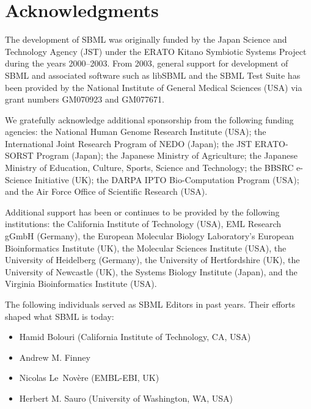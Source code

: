 
\section{Acknowledgments}
\label{sec:acknowledgements}
\label{sec:acknowledgments}

The development of SBML was originally funded by the Japan Science
and Technology Agency (JST) under the ERATO Kitano Symbiotic
Systems Project during the years 2000--2003.  From 2003, general
support for development of SBML and associated software such as
libSBML and the SBML Test Suite has been provided by the National
Institute of General Medical Sciences (USA) via grant numbers
GM070923 and GM077671.

We gratefully acknowledge additional sponsorship from the
following funding agencies: the National Human Genome Research
Institute (USA); the International Joint Research Program of NEDO
(Japan); the JST ERATO-SORST Program (Japan); the Japanese
Ministry of Agriculture; the Japanese Ministry of Education,
Culture, Sports, Science and Technology; the BBSRC e-Science
Initiative (UK); the DARPA IPTO Bio-Computation Program (USA); and
the Air Force Office of Scientific Research (USA).

Additional support has been or continues to be provided by the
following institutions: the California Institute of Technology
(USA), EML Research gGmbH (Germany), the European Molecular
Biology Laboratory's European Bioinformatics Institute (UK), the
Molecular Sciences Institute (USA), the University of Heidelberg
(Germany), the University of Hertfordshire (UK), the University of
Newcastle (UK), the Systems Biology Institute (Japan), and the
Virginia Bioinformatics Institute (USA).

The following individuals served as SBML Editors in past years.
Their efforts shaped what SBML is today:
\begin{itemize}\setlength{\parskip}{-0.2ex}

\item Hamid Bolouri (California Institute of Technology, CA, USA)
\item Andrew M. Finney
\item Nicolas Le~Nov\`{e}re (EMBL-EBI, UK)
\item Herbert M. Sauro (University of Washington, WA, USA)

\end{itemize}

